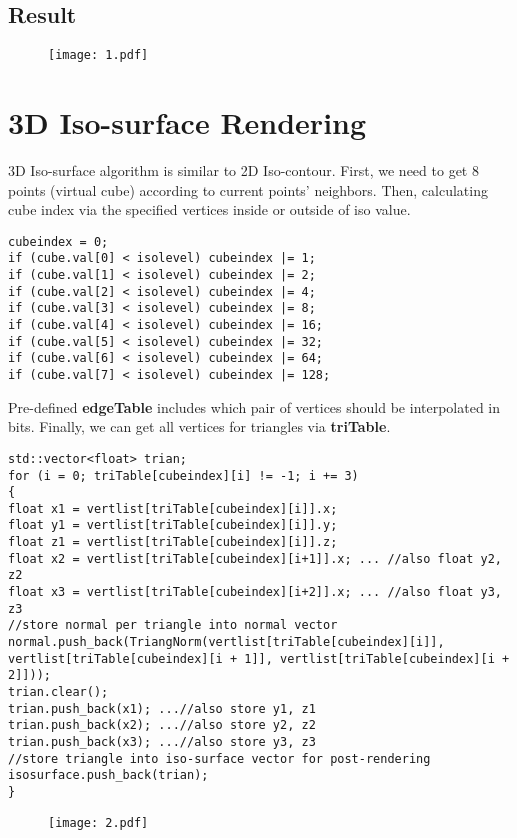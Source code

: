 \documentclass[12pt,letterpaper,fleqn]{article}          %
\begin{document}
\subsection{Result}

\begin{figure}[!htb]
\centering
\texttt{[image: 1.pdf]}
\end{figure}





\section{3D Iso-surface Rendering}
3D Iso-surface algorithm is similar to 2D Iso-contour. First, we need to get 8 points (virtual cube) according to current points' neighbors. Then, calculating cube index via the specified vertices inside or outside of iso value.
\begin{lstlisting}
cubeindex = 0;
if (cube.val[0] < isolevel) cubeindex |= 1;
if (cube.val[1] < isolevel) cubeindex |= 2;
if (cube.val[2] < isolevel) cubeindex |= 4;
if (cube.val[3] < isolevel) cubeindex |= 8;
if (cube.val[4] < isolevel) cubeindex |= 16;
if (cube.val[5] < isolevel) cubeindex |= 32;
if (cube.val[6] < isolevel) cubeindex |= 64;
if (cube.val[7] < isolevel) cubeindex |= 128;
\end{lstlisting}
Pre-defined \textbf{edgeTable} includes which pair of vertices should be interpolated in bits. Finally, we can get all vertices for triangles via   \textbf{triTable}. 
\begin{lstlisting}
std::vector<float> trian;
for (i = 0; triTable[cubeindex][i] != -1; i += 3)
{
float x1 = vertlist[triTable[cubeindex][i]].x;
float y1 = vertlist[triTable[cubeindex][i]].y;
float z1 = vertlist[triTable[cubeindex][i]].z;
float x2 = vertlist[triTable[cubeindex][i+1]].x; ... //also float y2, z2
float x3 = vertlist[triTable[cubeindex][i+2]].x; ... //also float y3, z3
//store normal per triangle into normal vector
normal.push_back(TriangNorm(vertlist[triTable[cubeindex][i]], vertlist[triTable[cubeindex][i + 1]], vertlist[triTable[cubeindex][i + 2]]));
trian.clear();
trian.push_back(x1); ...//also store y1, z1
trian.push_back(x2); ...//also store y2, z2
trian.push_back(x3); ...//also store y3, z3
//store triangle into iso-surface vector for post-rendering
isosurface.push_back(trian); 
}
\end{lstlisting}


\begin{figure}[!htb]
\centering
\texttt{[image: 2.pdf]}
\end{figure}
\end{document}

